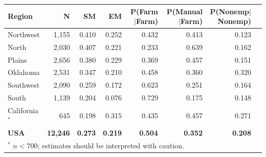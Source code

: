 \begin{centering}
\footnotesize
\renewcommand{\arraystretch}{1.2}
\begin{tabular}{lrrrrrrr}
\toprule
\textbf{Region} & \textbf{N} & \textbf{SM} & \textbf{EM} & \textbf{P(Farm$|$Farm)} & \textbf{P(Manual$|$Farm)} & \textbf{P(Nonemp$|$Nonemp)} \\
\midrule
Northwest      & 1{,}155 & 0.410 & 0.252 & 0.432 & 0.413 & 0.123 \\
North          & 2{,}030 & 0.407 & 0.221 & 0.233 & 0.639 & 0.162 \\
Plains         & 2{,}656 & 0.380 & 0.229 & 0.369 & 0.457 & 0.151 \\
Oklahoma       & 2{,}531 & 0.347 & 0.210 & 0.458 & 0.360 & 0.320 \\
Southwest      & 2{,}090 & 0.259 & 0.172 & 0.623 & 0.251 & 0.164 \\
South          & 1{,}139 & 0.204 & 0.076 & 0.729 & 0.175 & 0.148 \\
California$^*$ &   645   & 0.198 & 0.315 & 0.435 & 0.457 & 0.271 \\
\midrule
\textbf{USA}   & \textbf{12{,}246} & \textbf{0.273} & \textbf{0.219} & \textbf{0.504} & \textbf{0.352} & \textbf{0.208} \\
\bottomrule
\multicolumn{7}{l}{$^*$ $n < 700$; estimates should be interpreted with caution.}
\end{tabular}
\end{centering}
